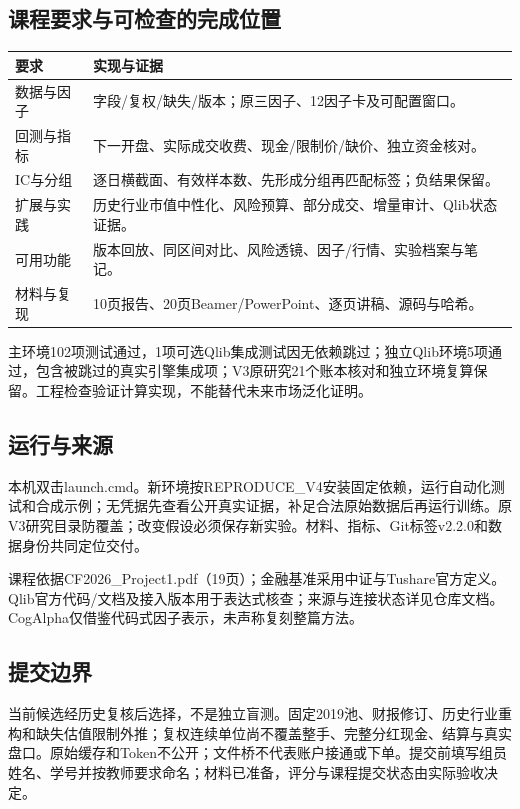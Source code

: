\documentclass[UTF8,a4paper,10pt]{ctexart}
\begin{document}
\subsection*{课程要求与可检查的完成位置}
\begin{center}\small\begin{tabularx}{\textwidth}{lX}\toprule
要求 & 实现与证据\\\midrule
数据与因子 & 字段/复权/缺失/版本；原三因子、12因子卡及可配置窗口。\\
回测与指标 & 下一开盘、实际成交收费、现金/限制价/缺价、独立资金核对。\\
IC与分组 & 逐日横截面、有效样本数、先形成分组再匹配标签；负结果保留。\\
扩展与实践 & 历史行业市值中性化、风险预算、部分成交、增量审计、Qlib状态证据。\\
可用功能 & 版本回放、同区间对比、风险透镜、因子/行情、实验档案与笔记。\\
材料与复现 & 10页报告、20页Beamer/PowerPoint、逐页讲稿、源码与哈希。\\\bottomrule
\end{tabularx}\end{center}
主环境102项测试通过，1项可选Qlib集成测试因无依赖跳过；独立Qlib环境5项通过，包含被跳过的真实引擎集成项；V3原研究21个账本核对和独立环境复算保留。工程检查验证计算实现，不能替代未来市场泛化证明。
\subsection*{运行与来源}
本机双击launch.cmd。新环境按REPRODUCE\_V4安装固定依赖，运行自动化测试和合成示例；无凭据先查看公开真实证据，补足合法原始数据后再运行训练。原V3研究目录防覆盖；改变假设必须保存新实验。材料、指标、Git标签v2.2.0和数据身份共同定位交付。

课程依据CF2026\_Project1.pdf（19页）；金融基准采用中证与Tushare官方定义。Qlib官方代码/文档及接入版本用于表达式核查；来源与连接状态详见仓库文档。CogAlpha仅借鉴代码式因子表示，未声称复刻整篇方法。
\subsection*{提交边界}
当前候选经历史复核后选择，不是独立盲测。固定2019池、财报修订、历史行业重构和缺失估值限制外推；复权连续单位尚不覆盖整手、完整分红现金、结算与真实盘口。原始缓存和Token不公开；文件桥不代表账户接通或下单。提交前填写组员姓名、学号并按教师要求命名；材料已准备，评分与课程提交状态由实际验收决定。
\end{document}
